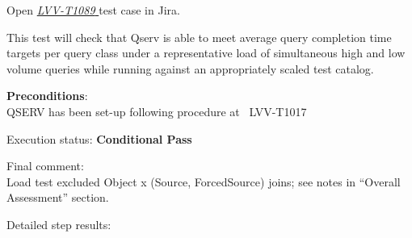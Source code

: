 \documentclass[DM,lsstdraft,STR,toc]{lsstdoc}
\begin{document}
Open  \href{https://jira.lsstcorp.org/secure/Tests.jspa#/testCase/LVV-T1089}{\textit{ LVV-T1089 } }
test case in Jira.

    This test will check that Qserv is able to meet average query completion
time targets per query class under a representative load of simultaneous
high and low volume queries while running against an appropriately
scaled test catalog.


    \textbf{ Preconditions}:\\
    QSERV has been set-up following procedure at ~LVV-T1017


    Execution status: {\bf Conditional Pass }

    Final comment:\\Load test excluded Object x (Source, ForcedSource) joins; see notes in
``Overall Assessment'' section.



    Detailed step results:
\end{document}
